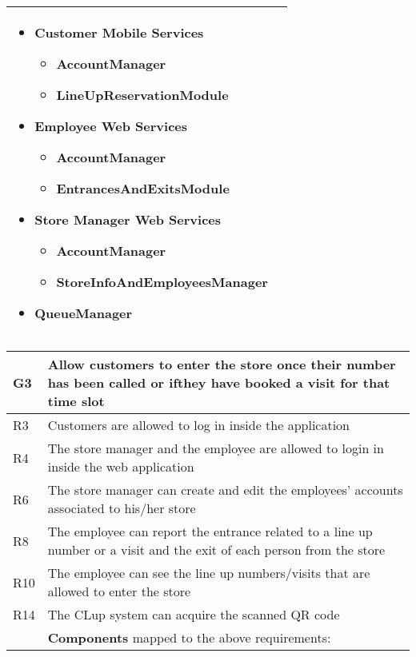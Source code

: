 \begin{center}
{\begin{longtable}{L{2.5cm}L{12cm}}
        \medskip 
        \begin{itemize}
            \item Customer Mobile Services \begin{itemize}
                \item AccountManager
                \item LineUpReservationModule
            \end{itemize}
            \item Employee Web Services \begin{itemize}
                \item AccountManager
                \item EntrancesAndExitsModule
            \end{itemize}
            \item Store Manager Web Services \begin{itemize}
                \item AccountManager
                \item StoreInfoAndEmployeesManager
            \end{itemize}
            \item QueueManager
        \end{itemize} \\
        \hline
    \end{longtable}}

    {\renewcommand{\arraystretch}{1.5}
    \begin{longtable}{L{2.5cm}L{12cm}}
        \hline
        \textbf{G3} & \textbf{Allow customers to enter the store once their number has been called or ifthey have booked a visit for that time slot} \\
        \hline
         R3 & Customers are allowed to log in inside the application \\
        \hline
         R4 & The store manager and the employee are allowed to login in inside the web application \\
        \hline
         R6 & The store manager can create and edit the employees’ accounts associated to his/her store \\
        \hline
         R8 & The employee can report the entrance related to a line up number or a visit and the exit of each person from the store \\
        \hline
         R10 & The employee can see the line up numbers/visits that are allowed to enter the store \\
        \hline
         R14 & The CLup system can acquire the scanned QR code \\
        \hline
         & \textbf{Components} mapped to the above requirements:


\end{longtable}}
\end{center}
